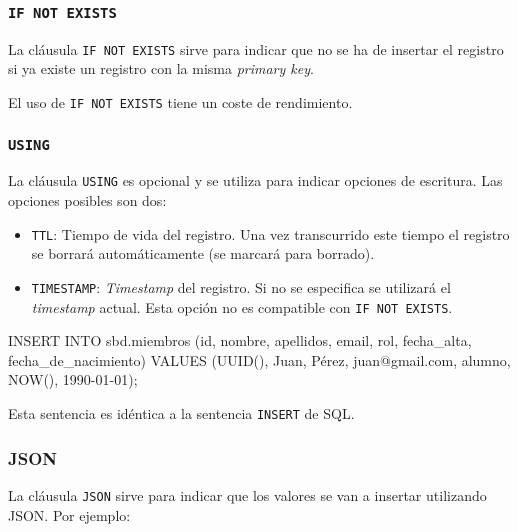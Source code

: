 \documentclass[
]{book}
\newenvironment{Shaded}{}{}
\newcommand{\NormalTok}[1]{#1}
\providecommand{\tightlist}{%
  \setlength{\itemsep}{0pt}\setlength{\parskip}{0pt}}
\begin{document}
\subsubsection{\texorpdfstring{\texttt{IF\ NOT\ EXISTS}}{IF NOT EXISTS}}\label{if-not-exists-1}

La cláusula \texttt{IF\ NOT\ EXISTS} sirve para indicar que no se ha de insertar el registro si ya existe un registro con la misma \emph{primary key}.

El uso de \texttt{IF\ NOT\ EXISTS} tiene un coste de rendimiento.

\subsubsection{\texorpdfstring{\texttt{USING}}{USING}}\label{using}

La cláusula \texttt{USING} es opcional y se utiliza para indicar opciones de escritura. Las opciones posibles son dos:

\begin{itemize}
\tightlist
\item
  \texttt{TTL}: Tiempo de vida del registro. Una vez transcurrido este tiempo el registro se borrará automáticamente (se marcará para borrado).
\item
  \texttt{TIMESTAMP}: \emph{Timestamp} del registro. Si no se especifica se utilizará el \emph{timestamp} actual. Esta opción no es compatible con \texttt{IF\ NOT\ EXISTS}.
\end{itemize}

\begin{Shaded}
\begin{Highlighting}[]
\NormalTok{INSERT INTO sbd.miembros (id, nombre, apellidos, email, rol, fecha\_alta, fecha\_de\_nacimiento)}
\NormalTok{VALUES (UUID(), \textquotesingle{}Juan\textquotesingle{}, \textquotesingle{}Pérez\textquotesingle{}, \textquotesingle{}juan@gmail.com\textquotesingle{}, \textquotesingle{}alumno\textquotesingle{}, NOW(), \textquotesingle{}1990{-}01{-}01\textquotesingle{});}
\end{Highlighting}
\end{Shaded}

Esta sentencia es idéntica a la sentencia \texttt{INSERT} de SQL.

\subsubsection{JSON}\label{json}

La cláusula \texttt{JSON} sirve para indicar que los valores se van a insertar utilizando JSON. Por ejemplo:
\end{document}
